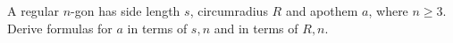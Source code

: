 A regular $ n $-gon has side length $ s $, circumradius $ R $ and apothem $ a $, where $ n\ge3 $. Derive formulas for $ a $ in terms of $ s,n $ and in terms of $ R,n $.
